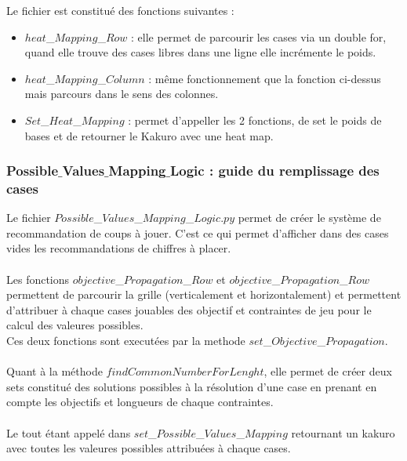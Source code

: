\documentclass[french,12pt]{article}
\begin{document}
Le fichier est constitué des fonctions suivantes : \\
\begin{itemize}

\item[]$heat$\_$Mapping$\_$Row$ : elle permet de parcourir les cases via un double for, quand elle trouve des cases libres dans  une ligne elle incrémente le poids. \\

\item[]$heat$\_$Mapping$\_$Column$ : même fonctionnement que la fonction ci-dessus mais parcours dans le sens des colonnes. \\

\item[]$Set$\_$Heat$\_$Mapping$ : permet d'appeller les 2 fonctions, de set le poids de bases et de retourner le Kakuro avec une heat map.\\
\end{itemize}

\subsubsection{Possible$\_$Values$\_$Mapping$\_$Logic : guide du remplissage des cases}
Le fichier $Possible$\_$Values$\_$Mapping$\_$Logic.py$ permet de créer le système de recommandation de coups à jouer. C'est ce qui permet d'afficher dans des cases vides les recommandations de chiffres à placer. \\ \\

Les fonctions $objective$\_$Propagation$\_$Row$ et $objective$\_$Propagation$\_$Row$ permettent de parcourir la grille (verticalement et horizontalement) et permettent d'attribuer à chaque cases jouables des objectif et contraintes de jeu pour le calcul des valeures possibles. \\
Ces deux fonctions sont executées par la methode $set$\_$Objective$\_$Propagation$. \\ \\
Quant à la méthode $findCommonNumberForLenght$, elle permet de créer deux sets constitué des solutions possibles à la résolution d'une case en prenant en compte les objectifs et longueurs de chaque contraintes. \\ \\ Le tout étant appelé dans $set$\_$Possible$\_$Values$\_$Mapping$ retournant un kakuro avec toutes les valeures possibles attribuées à chaque cases. 
\end{document}
